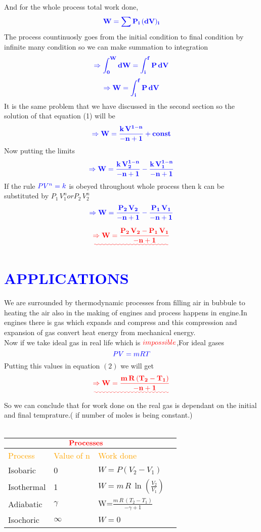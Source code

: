 \documentclass[12pt]{article}
\begin{document}
And for the whole process total work done,
\[
\textcolor{blue}
{
\mathbf
{ W =\sum P_i\,(dV)_i}
}
\]
The process countinuosly goes from the initial condition to final condition by infinite many condition so we can make summation to integration
\[
\textcolor{blue}
{
\mathbf
{\Rightarrow \int_0^W dW = \int_i^f P\,dV}
}
\]
\[
\textcolor{blue}
{
\mathbf
{\Rightarrow W = \int_i^f P\,dV}
}
\]
It is the same problem that we have discussed in the second section so the solution of that equation (1) will be
\[
\textcolor{blue}
{
\mathbf
{\Rightarrow W = \frac{k\,V^{1-n}}{-n+1} + const }
}
\]
Now putting the limits 
 \[
\textcolor{blue}
{
\mathbf
{\Rightarrow W = \frac{k\,V_2^{1-n}}{-n+1} - \frac{k\,V_1^{1-n}}{-n+1} }}
\]
If the rule $\textcolor{blue}{PV^n=k}$ is obeyed throughout whole process then k can be substituted by $P_1\,V_1^n or P_2\,V_2^n$ \\
\[
\textcolor{blue}
{
\mathbf
{ \Rightarrow W = \frac{P_2\,V_2}{-n+1} - \frac{P_1\,V_1}{-n+1} }
}
\]

\[
\textcolor{red}
{
\mathbf
{\uwave
{ \Rightarrow W = \frac{{P_2\,V_2}-{P_1\,V_1}}{-n+1}}
}}
\]


\large
\section{\textcolor{blue}{ APPLICATIONS }}
\textsf
We are surrounded by thermodynamic processes from filling air in bubbule to heating the air also in the making of engines and process happens in engine.In engines there is gas which expands and compress and this compression and expansion of gas convert heat energy from mechanical energy.
\\
Now if we take ideal gas in real life which is $\textcolor{red}{impossible}$,For ideal gases
\[
\textcolor{blue}
{
PV = mRT
}
\]
Putting this values in equation $(2)$ we will get
\[
\textcolor{red}
{
\mathbf
{\uwave
{ \Rightarrow W = \frac{ m \,R\,(T_2 - T_1)}{-n+1} }
}}
\]
So we can conclude that for work done on the real gas is dependant on the initial and final temprature.( if number of moles is being constant.)
\\
\\
\begin{tabular}{ |p{3cm}||p{3cm}|p{5cm}|p{3cm}|  }
 \hline
 \multicolumn{3}{|c|}{$\bf\textcolor{red}{Processes}$
 }\\
 \hline
 \textcolor{orange}{Process}     &  \textcolor{orange}{ Value of n} &  \textcolor{orange}{Work done}\\\hline
 Isobaric   & 0    & $W=P(V_2 - V_1)$\\
 Isothermal&   1  & $W=m\,R\,\ln(\frac{V_2}{V_1})$\\
 Adiabatic &$\gamma$ & W=$\frac{m\,R\,(T_2 - T_1)}{-\gamma + 1}$\\
 Isochoric    &$\infty$ & $W=0$\\
 \hline
\end{tabular}
\\
\\
\large
\end{document}
